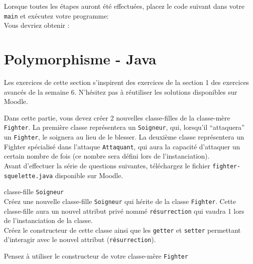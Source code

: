 \newpage
Lorsque toutes les étapes auront été effectuées, placez le code suivant dans votre \lstinline{main} et exécutez votre programme:\\




Vous devriez obtenir :



\newpage
\section{Polymorphisme - Java}

Les exercices de cette section s'inspirent des exercices de la section 1 des exercices avancés de la semaine 6.
N'hésitez pas à réutiliser les solutions disponibles sur Moodle.

Dans cette partie, vous devez créer 2 nouvelles classe-filles de la classe-mère \lstinline{Fighter}. La première classe représentera un \lstinline{Soigneur}, qui, lorsqu'il ``attaquera'' un \lstinline{Fighter}, le soignera au lieu de le blesser. La deuxième classe représentera un Fighter spécialisé dans l'attaque \lstinline{Attaquant}, qui aura la capacité d'attaquer un certain nombre de fois (ce nombre sera défini lors de l'instanciation).\\

Avant d'effectuer la série de questions suivantes, téléchargez le fichier \lstinline{fighter-squelette.java} disponible sur Moodle.\\

% 

\begin{Exercice}[5 minutes] classe-fille \lstinline{Soigneur} \\
Créez une nouvelle classe-fille \lstinline{Soigneur} qui hérite de la classe \lstinline{Fighter}. Cette classe-fille aura un nouvel attribut privé nommé \lstinline{résurrection} qui vaudra 1 lors de l'instanciation de la classe. \\

Créez le constructeur de cette classe ainsi que les \lstinline{getter} et \lstinline{setter} permettant d'interagir avec le nouvel attribut (\lstinline{résurrection}). \\

\begin{conseil}
Pensez à utiliser le constructeur de votre classe-mère \lstinline{Fighter}
\end{conseil}

\begin{solution}
	
\end{solution}

\end{Exercice}

